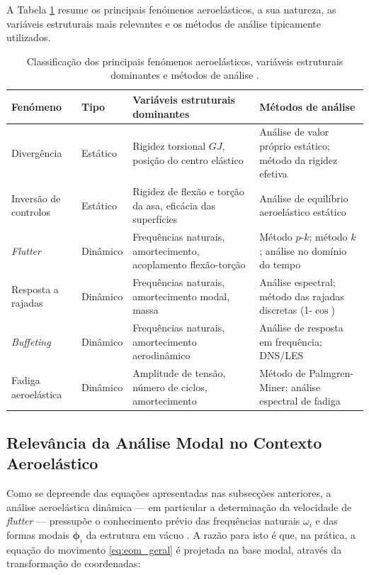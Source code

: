 \documentclass[11pt,twoside,a4paper]{report}
\begin{document}
A Tabela \ref{tab:fenomenos_aero} resume os principais fenómenos aeroelásticos, a sua natureza, as variáveis estruturais mais relevantes e os métodos de análise tipicamente utilizados.

\begin{table}[h!]
\centering
\caption{Classificação dos principais fenómenos aeroelásticos, variáveis 
estruturais dominantes e métodos de análise \cite{Wright2015, Dowell2004}.}
\label{tab:fenomenos_aero}
\renewcommand{\arraystretch}{1.4}
\begin{tabularx}{\textwidth}{p{2.5cm} p{1.8cm} X X}
\toprule
\textbf{Fenómeno} & \textbf{Tipo} & \textbf{Variáveis estruturais dominantes} & \textbf{Métodos de análise} \\
\midrule
Divergência & Estático & 
Rigidez torsional $GJ$, posição do centro elástico & 
Análise de valor próprio estático; método da rigidez efetiva \\
\midrule
Inversão de controlos & Estático & 
Rigidez de flexão e torção da asa, eficácia das superfícies & 
Análise de equilíbrio aeroelástico estático \\
\midrule
\textit{Flutter} & Dinâmico & 
Frequências naturais, amortecimento, acoplamento flexão-torção & 
Método $p$-$k$; método $k$; análise no domínio do tempo \\
\midrule
Resposta a rajadas & Dinâmico & 
Frequências naturais, amortecimento modal, massa & 
Análise espectral; método das rajadas discretas (1-$\cos$) \\
\midrule
\textit{Buffeting} & Dinâmico & 
Frequências naturais, amortecimento aerodinâmico & 
Análise de resposta em frequência; DNS/LES \\
\midrule
Fadiga aeroelástica & Dinâmico & 
Amplitude de tensão, número de ciclos, amortecimento & 
Método de Palmgren-Miner; análise espectral de fadiga \\
\bottomrule
\end{tabularx}
\end{table}

\subsection{Relevância da Análise Modal no Contexto Aeroelástico}

Como se depreende das equações apresentadas nas subsecções anteriores, a análise aeroelástica dinâmica --- em particular a determinação da velocidade de \textit{flutter} --- pressupõe o conhecimento prévio das frequências naturais $\omega_i$ e das formas modais $\boldsymbol{\phi}_i$ da estrutura em vácuo \cite{Craig2006}. A razão para isto é que, na prática, a equação do movimento \eqref{eq:eom_geral} é projetada na base modal, através da transformação de coordenadas:
\end{document}
